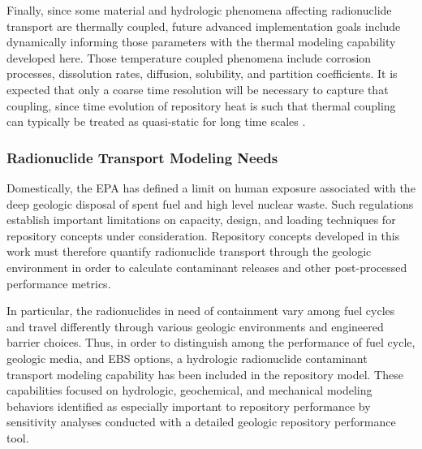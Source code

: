 Finally, since some material and hydrologic phenomena affecting radionuclide 
transport are thermally coupled, future advanced implementation goals include 
dynamically informing those parameters with the thermal modeling capability 
developed here. Those temperature coupled phenomena include corrosion processes, 
dissolution rates, diffusion, solubility, and partition coefficients.  It is 
expected that only a coarse time resolution will be necessary to capture that 
coupling, since time evolution of repository heat is such that thermal coupling 
can typically be treated as quasi-static for long time scales 
\cite{andra_argile:_2005}.  




\subsubsection{Radionuclide Transport Modeling Needs}

Domestically, the \gls{EPA} has defined a limit on  human 
exposure associated with the deep geologic disposal of spent fuel and high 
level nuclear waste. Such regulations establish important limitations on 
capacity, design, and loading techniques for repository concepts under 
consideration. Repository concepts developed in this work must therefore 
quantify radionuclide transport through the geologic environment in order to 
calculate contaminant releases and other post-processed performance metrics. 

In particular, the radionuclides in need of containment vary among fuel cycles 
and travel differently through various geologic environments and engineered 
barrier choices. Thus, in order to distinguish among the performance of fuel 
cycle, geologic media, and \gls{EBS} options, a hydrologic radionuclide 
contaminant transport modeling capability has been included in the repository 
model.  These capabilities focused on hydrologic, geochemical, and 
mechanical modeling behaviors identified as especially important to repository 
performance by sensitivity analyses conducted with a detailed geologic 
repository performance tool.  

